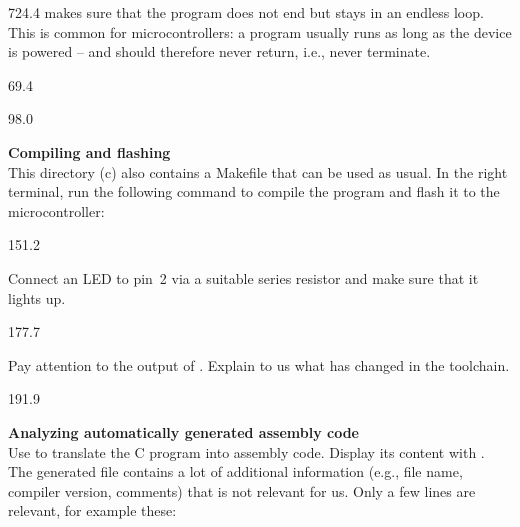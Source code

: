 \documentclass{aslab}
\begin{document}
\begin{region}[x=80.7,right=0,pitch=13.3]{724.4}
makes sure that the program does not end but stays in an endless loop. This
is common for microcontrollers: a program usually runs as long as the device
is powered -- and  should therefore never return, i.e., never
terminate.
\end{region}

\nextpage
\begin{region}{69.4}
\end{region}

\begin{region}[pitch=13.3]{98.0}
\begin{numlist}
\item \textbf{Compiling and flashing}\\
  This directory (c) also contains a Makefile that can be used as usual. In
  the right terminal, run the following command to compile the program and
  flash it to the microcontroller:\\ 
\end{numlist}
\end{region}

\begin{region}[x=74.7,right=0,pitch=13.1]{151.2}
\begin{alphasub}
\item Connect an LED to pin~2 via a suitable series resistor and make sure
  that it lights up.
\end{alphasub}
\end{region}

\begin{region}[x=74.7,right=0]{177.7}
\begin{alphasub}[start=2]
\item Pay attention to the output of . Explain to us what has
  changed in the toolchain.
\end{alphasub}
\end{region}

\begin{region}[pitch=13.4]{191.9}
\begin{numlist}[start=2]
\item \textbf{Analyzing automatically generated assembly code}\\
  Use  to translate the C program into assembly
  code. Display its content with . The generated
  file contains a lot of additional information (e.g., file name, compiler
  version, comments) that is not relevant for us. Only a few lines are
  relevant, for example these:
\end{numlist}
\end{region}
\end{document}

